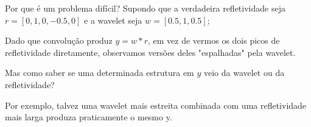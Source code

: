 \begin{frame}{Por que é um problema difícil?}
    Supondo que a verdadeira refletividade seja $r = [0,1,0,-0.5,0]$ 
    e a wavelet seja $w = [0.5,1,0.5]$;

    Dado que convolução produz $y = w * r$, em vez de vermos os dois picos de 
    refletividade diretamente, observamos versões deles "espalhadas" pela wavelet.

    Mas como saber se uma determinada estrutura em \(y\) veio da wavelet ou da 
    refletividade?

    Por exemplo, talvez uma wavelet mais estreita combinada com uma refletividade 
    mais larga produza praticamente o mesmo y.
\end{frame}